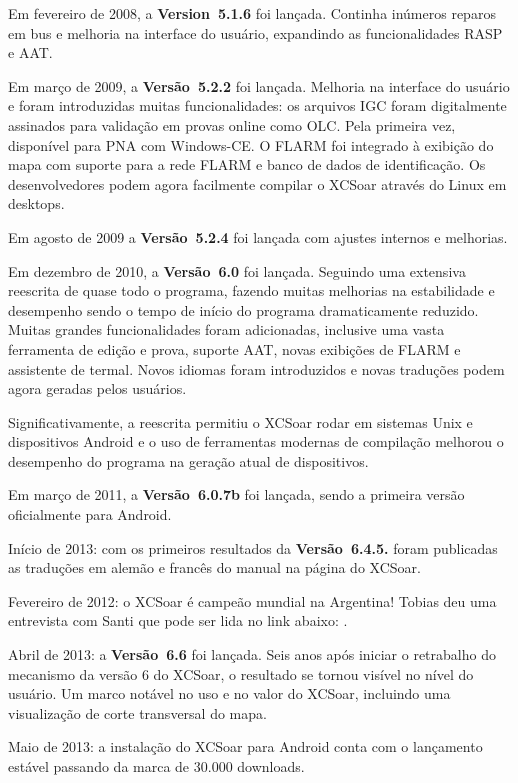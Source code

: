 Em fevereiro de 2008, a {\bf Version~5.1.6} foi lançada.  Continha inúmeros reparos em bus e melhoria na interface do usuário, expandindo as funcionalidades RASP e AAT. 

Em março de 2009, a {\bf Versão~5.2.2} foi lançada.  Melhoria na interface do usuário e foram introduzidas muitas funcionalidades: os arquivos IGC foram digitalmente assinados para validação em provas online como OLC.  Pela primeira vez, disponível para PNA com Windows-CE.  O FLARM foi integrado à exibição do mapa com suporte para a rede FLARM e banco de dados de identificação.  Os desenvolvedores podem agora facilmente compilar o XCSoar através do Linux em desktops. 

Em agosto de 2009 a {\bf Versão~5.2.4} foi lançada com ajustes internos e melhorias.

Em dezembro de 2010, a {\bf Versão~6.0} foi lançada.  Seguindo uma extensiva reescrita de quase todo o programa, fazendo muitas melhorias na estabilidade e desempenho sendo o tempo de início do programa dramaticamente reduzido.  Muitas grandes funcionalidades foram adicionadas, inclusive uma vasta ferramenta de edição e prova, suporte AAT, novas exibições de FLARM e assistente de termal.   Novos idiomas foram introduzidos e novas traduções podem agora geradas pelos usuários.

Significativamente, a reescrita permitiu o XCSoar rodar em sistemas Unix e dispositivos Android e o uso de ferramentas modernas de compilação melhorou o desempenho do programa na geração atual de dispositivos.

Em março de 2011, a {\bf Versão~6.0.7b} foi lançada, sendo a primeira versão oficialmente para Android.

Início de 2013: com os primeiros resultados da {\bf Versão~6.4.5.} foram publicadas as traduções em alemão e francês do manual na página do XCSoar.

Fevereiro de 2012: o XCSoar é campeão mundial na Argentina!  Tobias deu uma entrevista com Santi que pode ser lida no link abaixo:
.

Abril de 2013: a {\bf Versão~6.6} foi lançada.  Seis anos após iniciar o retrabalho do mecanismo da versão 6  do XCSoar, o resultado se tornou visível no nível do usuário.  Um marco notável no uso e no valor do XCSoar, incluindo uma visualização de corte transversal do mapa.

Maio de 2013: a instalação do XCSoar para Android conta com o lançamento estável passando da marca de 30.000 downloads.


